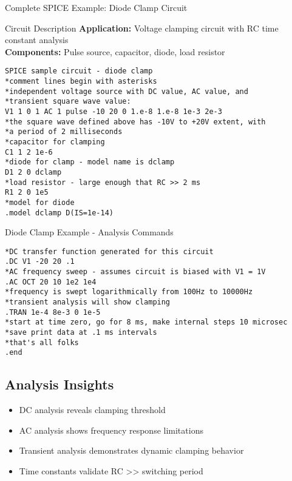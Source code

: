 \documentclass{beamer}
\begin{document}
\begin{frame}[fragile]{Complete SPICE Example: Diode Clamp Circuit}
    \begin{alertblock}{Circuit Description}
        \textbf{Application:} Voltage clamping circuit with RC time constant analysis \\
        \textbf{Components:} Pulse source, capacitor, diode, load resistor
    \end{alertblock}
    
    \begin{verbatim}
SPICE sample circuit - diode clamp
*comment lines begin with asterisks
*independent voltage source with DC value, AC value, and
*transient square wave value:
V1 1 0 1 AC 1 pulse -10 20 0 1.e-8 1.e-8 1e-3 2e-3
*the square wave defined above has -10V to +20V extent, with
*a period of 2 milliseconds
*capacitor for clamping
C1 1 2 1e-6
*diode for clamp - model name is dclamp
D1 2 0 dclamp
*load resistor - large enough that RC >> 2 ms
R1 2 0 1e5
*model for diode
.model dclamp D(IS=1e-14)
    \end{verbatim}
\end{frame}

\begin{frame}[fragile]{Diode Clamp Example - Analysis Commands}
    \begin{verbatim}
*DC transfer function generated for this circuit
.DC V1 -20 20 .1
*AC frequency sweep - assumes circuit is biased with V1 = 1V
.AC OCT 20 10 1e2 1e4
*frequency is swept logarithmically from 100Hz to 10000Hz
*transient analysis will show clamping
.TRAN 1e-4 8e-3 0 1e-5
*start at time zero, go for 8 ms, make internal steps 10 microsec
*save print data at .1 ms intervals
*that's all folks
.end
    \end{verbatim}
    
    \subsection{Analysis Insights}
    \begin{itemize}
        \item DC analysis reveals clamping threshold
        \item AC analysis shows frequency response limitations
        \item Transient analysis demonstrates dynamic clamping behavior
        \item Time constants validate RC >> switching period
    \end{itemize}
\end{frame}
\end{document}
